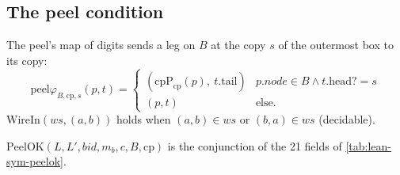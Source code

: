 \subsection{The peel condition}

\begin{definition}
The peel's map of digits sends a leg on $B$ at the copy $s$ of the outermost box to its copy:
\[
\mathrm{peel}\varphi_{B,\mathrm{cp},s}(p,t)=\begin{cases}(\mathrm{cpP}_{\mathrm{cp}}(p),\ t.\mathrm{tail})&p.\mathit{node}\in B\land t.\mathrm{head?}=s\\(p,t)&\text{else.}\end{cases}
\]
$\mathrm{WireIn}(ws,(a,b))$ holds when $(a,b)\in ws$ or $(b,a)\in ws$ (decidable).
\end{definition}

\begin{definition}\label{def:lean-sym-peelok}
$\mathrm{PeelOK}(L,L',\mathit{bid},m_b,c,B,\mathrm{cp})$ is the conjunction of the 21 fields of \cref{tab:lean-sym-peelok}.
\end{definition}

